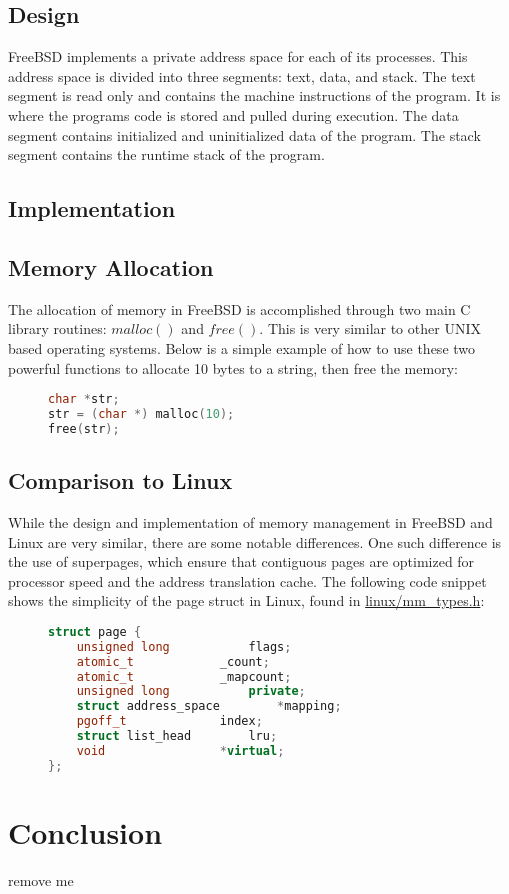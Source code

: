 \documentclass[letterpaper,draftclsnofoot,10pt,onecolumn,titlepage]{IEEEtran}\usepackage[margin=0.75in]{geometry}
\begin{document}
\subsection{Design}
FreeBSD implements a private address space for each of its processes. This address space is divided into three 
segments: text, data, and stack. The text segment is read only and contains the machine instructions of 
the program. It is where the programs code is stored and pulled during execution. The data segment 
contains initialized and uninitialized data of the program. The stack segment contains the runtime stack 
of the program.


\subsection{Implementation}

\subsection{Memory Allocation}
The allocation of memory in FreeBSD is accomplished through two main C library routines: $malloc()$ and $free()$.
This is very similar to other UNIX based operating systems. Below is a simple example of how to use these 
two powerful functions to allocate 10 bytes to a string, then free the memory:

\begin{figure}[H]
\begin{lstlisting}[language=C++]
char *str;
str = (char *) malloc(10);
free(str);
\end{lstlisting}
\end{figure}

\subsection{Comparison to Linux}
While the design and implementation of memory management in FreeBSD and Linux are very similar, there are 
some notable differences. One such difference is the use of superpages, which ensure that contiguous pages 
are optimized for processor speed and the address translation cache. The following code snippet shows the 
simplicity of the page struct in Linux, found in \url{linux/mm_types.h}:

\begin{figure}[H]
\begin{lstlisting}[language=C++]
struct page {
	unsigned long 			flags;
	atomic_t			_count;
	atomic_t			_mapcount;
	unsigned long			private;
	struct address_space		*mapping;
	pgoff_t				index;
	struct list_head		lru;
	void				*virtual;
};
\end{lstlisting}
\end{figure}


\section{Conclusion}


remove me\cite{Windows}


\end{document}
